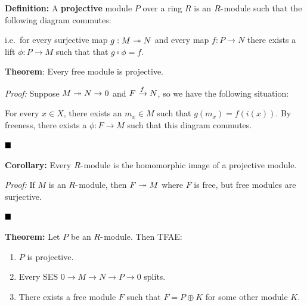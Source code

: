 \textbf{Definition:} A \textbf{projective} module \(P\) over a ring
\(R\) is an \(R{\hbox{-}}\)module such that the following diagram commutes:

\begin{center}
\end{center}

i.e.~for every surjective map \(g:M \twoheadrightarrow N\) and every map
\(f: P \to N\) there exists a lift \(\phi: P \to M\) such that that
\(g \circ \phi = f\).

\textbf{Theorem}: Every free module is projective.

\emph{Proof:} Suppose \(M \twoheadrightarrow N \to 0\) and \(F \xrightarrow{f} N\),
so we have the following situation:

\begin{center}
\end{center}

For every \(x\in X\), there exists an \(m_x \in M\) such that
\(g(m_x) = f(i(x))\). By freeness, there exists a \(\phi: F \to M\) such
that this diagram commutes.

\(\qed\)

\textbf{Corollary:} Every \(R{\hbox{-}}\)module is the homomorphic image of a
projective module.

\emph{Proof:} If \(M\) is an \(R{\hbox{-}}\)module, then \(F \twoheadrightarrow M\)
where \(F\) is free, but free modules are surjective.

\(\qed\)

\textbf{Theorem:} Let \(P\) be an \(R{\hbox{-}}\)module. Then TFAE:

\begin{enumerate}
\def\labelenumi{\alph{enumi}.}
\item
  \(P\) is projective.
\item
  Every SES \(0 \to M \to N \to P \to 0\) splits.
\item
  There exists a free module \(F\) such that \(F = P \oplus K\) for some
  other module \(K\).
\end{enumerate}

